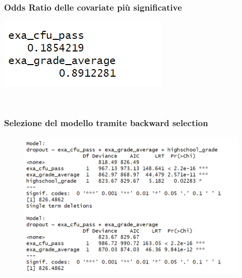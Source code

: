 \documentclass{beamer}
\begin{document}
\begin{frame}
\frametitle{Odds Ratio delle covariate più significative}
\begin{flushleft}
    \includegraphics[width=.5\textwidth]{Screenshot 2024-05-26 120049.png} %
    
\end{flushleft}

\\[.7cm]

\end{frame}

\begin{frame}
\frametitle{Selezione del modello tramite backward selection}
\begin{figure}[h]
    \centering
    \includegraphics[width=1\textwidth]{Screenshot 2024-05-26 120454.png} %
    \label{}
\end{figure}

\end{frame}
\end{document}
